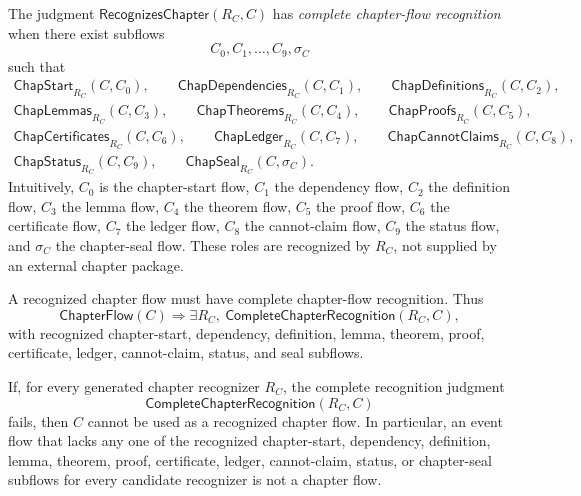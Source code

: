 \begin{definition}
\label{def:chapter-generated-complete-recognition}
The judgment $\mathsf{RecognizesChapter}(R_C,C)$ has \emph{complete chapter-flow recognition} when there exist subflows
$$
  C_0,C_1,\ldots,C_9,\sigma_C
$$
such that
$$
\begin{gathered}
  \mathsf{ChapStart}_{R_C}(C,C_0),\qquad
  \mathsf{ChapDependencies}_{R_C}(C,C_1),\qquad
  \mathsf{ChapDefinitions}_{R_C}(C,C_2),\\
  \mathsf{ChapLemmas}_{R_C}(C,C_3),\qquad
  \mathsf{ChapTheorems}_{R_C}(C,C_4),\qquad
  \mathsf{ChapProofs}_{R_C}(C,C_5),\\
  \mathsf{ChapCertificates}_{R_C}(C,C_6),\qquad
  \mathsf{ChapLedger}_{R_C}(C,C_7),\qquad
  \mathsf{ChapCannotClaims}_{R_C}(C,C_8),\\
  \mathsf{ChapStatus}_{R_C}(C,C_9),\qquad
  \mathsf{ChapSeal}_{R_C}(C,\sigma_C).
\end{gathered}
$$
Intuitively, $C_0$ is the chapter-start flow, $C_1$ the dependency flow, $C_2$ the definition flow, $C_3$ the lemma flow, $C_4$ the theorem flow, $C_5$ the proof flow, $C_6$ the certificate flow, $C_7$ the ledger flow, $C_8$ the cannot-claim flow, $C_9$ the status flow, and $\sigma_C$ the chapter-seal flow. These roles are recognized by $R_C$, not supplied by an external chapter package.
\end{definition}

\begin{principle}
\label{prin:chapter-generated-no-incomplete-chapter}
A recognized chapter flow must have complete chapter-flow recognition. Thus
$$
  \mathsf{ChapterFlow}(C)
  \Longrightarrow
  \exists R_C,\ \mathsf{CompleteChapterRecognition}(R_C,C),
$$
with recognized chapter-start, dependency, definition, lemma, theorem, proof, certificate, ledger, cannot-claim, status, and seal subflows.
\end{principle}

\begin{theorem}
\label{thm:chapter-generated-incomplete-not-chapter}
If, for every generated chapter recognizer $R_C$, the complete recognition judgment
$$
  \mathsf{CompleteChapterRecognition}(R_C,C)
$$
fails, then $C$ cannot be used as a recognized chapter flow. In particular, an event flow that lacks any one of the recognized chapter-start, dependency, definition, lemma, theorem, proof, certificate, ledger, cannot-claim, status, or chapter-seal subflows for every candidate recognizer is not a chapter flow.
\end{theorem}

